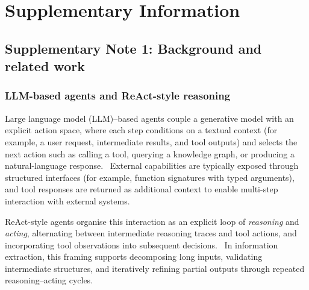 
\section{Supplementary Information}\label{sec:supplementary}


\if\sectionprefix\empty%
\else%
    \renewcommand{\thesection}{\sectionprefix}
\fi%

\subsection{Supplementary Note 1: Background and related work}\label{sec:supp-note-background}

\subsubsection{LLM-based agents and ReAct-style reasoning}
Large language model (LLM)--based agents couple a generative model with an explicit
action space, where each step conditions on a textual context (for example, a user
request, intermediate results, and tool outputs) and selects the next action such as
calling a tool, querying a knowledge graph, or producing a natural-language response.~\cite{yao2023react,schick_toolformer_2023,wu_autogen_2023,wang_survey_2024}
External capabilities are typically exposed through structured interfaces (for example,
function signatures with typed arguments), and tool responses are returned as additional
context to enable multi-step interaction with external systems.~\cite{schick_toolformer_2023,wang_survey_2024}

ReAct-style agents organise this interaction as an explicit loop of \emph{reasoning} and
\emph{acting}, alternating between intermediate reasoning traces and tool actions, and
incorporating tool observations into subsequent decisions.~\cite{yao2023react}
In information extraction, this framing supports decomposing long inputs, validating
intermediate structures, and iteratively refining partial outputs through repeated
reasoning--acting cycles.

